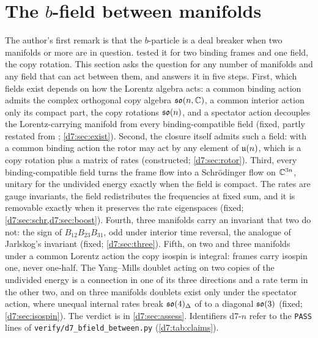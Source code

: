 \section{\texorpdfstring{The $b$-field between manifolds}{The b-field between manifolds}}
\label{d7:sec:main}

The author's first remark is that the $b$-particle is a deal breaker when two manifolds or more are in question. 
tested it for two binding frames and one field, the copy rotation. This section asks the question for any number of manifolds and any
field that can act between them, and answers it in five steps. First, which fields exist depends on how the Lorentz algebra acts: a common
binding action admits the complex orthogonal copy algebra $\mathfrak{so}(n,\mathbb{C})$, a common interior action only its compact part, the copy rotations $\mathfrak{so}(n)$, and a spectator action decouples the Lorentz-carrying manifold from every
binding-compatible field (fixed, partly restated from \cite{ES17}; \cref{d7:sec:exist}). Second, the closure itself admits such a field: with a
common binding action the rotor may act by any element of $\mathfrak{u}(n)$, which is a copy rotation plus a matrix of rates (constructed;
\cref{d7:sec:rotor}). Third, every binding-compatible field turns the frame flow into a Schr\"odinger flow on $\mathbb{C}^{3n}$, unitary for the
undivided energy exactly when the field is compact. The rates are gauge invariants, the field redistributes the frequencies at fixed sum, and
it is removable exactly when it preserves the rate eigenspaces (fixed; \cref{d7:sec:schr,d7:sec:boost}). Fourth, three manifolds carry an
invariant that two do not: the sign of $B_{12}B_{23}B_{31}$, odd under interior time reversal, the analogue of Jarlskog's invariant (fixed;
\cref{d7:sec:three}). Fifth, on two and three manifolds under a common Lorentz action the copy isospin is integral: frames carry isospin one, never one-half. The Yang--Mills doublet acting on two copies
of the undivided energy is a connection in one of its three directions and a rate term in the other two, and on three manifolds doublets exist only under the
spectator action, where unequal internal rates break $\mathfrak{so}(4)_\Delta$ of \cite{ES17} to a diagonal $\mathfrak{so}(3)$ (fixed; \cref{d7:sec:isospin}). The verdict
is in \cref{d7:sec:assess}. Identifiers d7-$n$ refer to the \texttt{PASS} lines of \texttt{verify/d7\_bfield\_between.py} (\cref{d7:tab:claims}).

